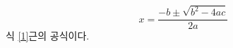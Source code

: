 \documentclass{oblivoir}
\begin{document}
	\begin{equation}
		x=\frac{-b\pm\sqrt{b^2-4ac}}{2a} \label{1}
	\end{equation}
	식 \ref{1}\는 근의 공식이다.
\end{document}
